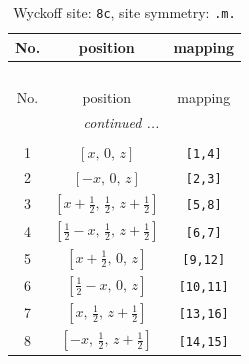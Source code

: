 \documentclass[fleqn,8pt]{jsarticle}
\begin{document}
\renewcommand{\arraystretch}{1.2}
\begin{longtable}{ccc}
\caption{Wyckoff site: {\tt 8c}, site symmetry: {\tt .m.}}
 \\
 \hline \hline
No. & position & mapping \\ \hline \endfirsthead

\multicolumn{2}{l}{\tablename\ \thetable{}} \\
 \hline \hline
No. & position & mapping \\ \hline \endhead

 \hline \hline
\multicolumn{2}{r}{\footnotesize\it continued ...} \\ \endfoot

 \hline \hline
\multicolumn{2}{r}{} \\ \endlastfoot

1 & $\left[ x,\, 0,\, z \right]$ & {\tt [1,4]} \\ \hline
2 & $\left[ - x,\, 0,\, z \right]$ & {\tt [2,3]} \\ \hline
3 & $\left[ x + \frac{1}{2},\, \frac{1}{2},\, z + \frac{1}{2} \right]$ & {\tt [5,8]} \\ \hline
4 & $\left[ \frac{1}{2} - x,\, \frac{1}{2},\, z + \frac{1}{2} \right]$ & {\tt [6,7]} \\ \hline
5 & $\left[ x + \frac{1}{2},\, 0,\, z \right]$ & {\tt [9,12]} \\ \hline
6 & $\left[ \frac{1}{2} - x,\, 0,\, z \right]$ & {\tt [10,11]} \\ \hline
7 & $\left[ x,\, \frac{1}{2},\, z + \frac{1}{2} \right]$ & {\tt [13,16]} \\ \hline
8 & $\left[ - x,\, \frac{1}{2},\, z + \frac{1}{2} \right]$ & {\tt [14,15]} \\
\end{longtable}
\renewcommand{\arraystretch}{1.2}
\end{document}
